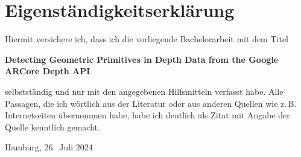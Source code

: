 
\printbibliography

\appendix

%
%

\clearpage

\thispagestyle{empty}

\section*{Eigenständigkeitserklärung}

Hiermit versichere ich, dass ich die vorliegende Bachelorarbeit mit dem Titel
\begin{center}
    \textbf{
        Detecting Geometric Primitives
        in Depth Data from the
        Google ARCore Depth API
    }
\end{center}
selbstständig und nur mit den angegebenen Hilfsmitteln verfasst habe. Alle
Passagen, die ich wörtlich aus der Literatur oder aus anderen Quellen wie
z.\,B. Internetseiten übernommen habe, habe ich deutlich als Zitat mit Angabe
der Quelle kenntlich gemacht.

%
\vspace{2cm}
%

Hamburg, 26.\ Juli 2024
